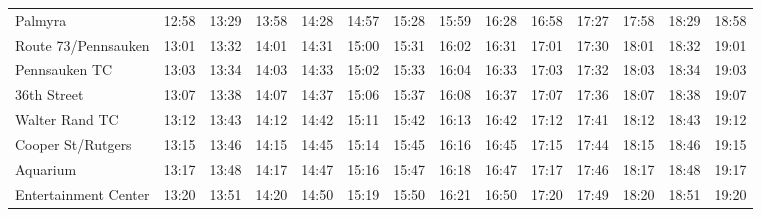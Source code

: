 \begin{center}
\begin{tabular}{@{}lrrrrrrrrrrrrr@{}}
Palmyra & 12:58 & 13:29 & 13:58 & 14:28 & 14:57 & 15:28 & 15:59 & 16:28 & 16:58 & 17:27 & 17:58 & 18:29 & 18:58 \\
Route 73/Pennsauken & 13:01 & 13:32 & 14:01 & 14:31 & 15:00 & 15:31 & 16:02 & 16:31 & 17:01 & 17:30 & 18:01 & 18:32 & 19:01 \\
Pennsauken TC & 13:03 & 13:34 & 14:03 & 14:33 & 15:02 & 15:33 & 16:04 & 16:33 & 17:03 & 17:32 & 18:03 & 18:34 & 19:03 \\
36th Street & 13:07 & 13:38 & 14:07 & 14:37 & 15:06 & 15:37 & 16:08 & 16:37 & 17:07 & 17:36 & 18:07 & 18:38 & 19:07 \\
Walter Rand TC & 13:12 & 13:43 & 14:12 & 14:42 & 15:11 & 15:42 & 16:13 & 16:42 & 17:12 & 17:41 & 18:12 & 18:43 & 19:12 \\
Cooper St/Rutgers & 13:15 & 13:46 & 14:15 & 14:45 & 15:14 & 15:45 & 16:16 & 16:45 & 17:15 & 17:44 & 18:15 & 18:46 & 19:15 \\
Aquarium & 13:17 & 13:48 & 14:17 & 14:47 & 15:16 & 15:47 & 16:18 & 16:47 & 17:17 & 17:46 & 18:17 & 18:48 & 19:17 \\
Entertainment Center & 13:20 & 13:51 & 14:20 & 14:50 & 15:19 & 15:50 & 16:21 & 16:50 & 17:20 & 17:49 & 18:20 & 18:51 & 19:20 \\
\bottomrule\end{tabular}\end{center}
